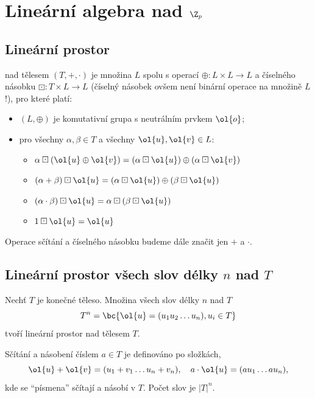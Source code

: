 \section{Lineární algebra nad \texorpdfstring{$\Z_p$}{Zp}}

\subsection{Lineární prostor}
 nad tělesem $(T, +, \cdot)$ je množina $L$ spolu s operací $\oplus : L \times L \rightarrow L$ a číselného násobku $\boxdot : T \times L \rightarrow L$ (číselný násobek ovšem není binární operace na množině $L$!), pro které platí:
\vspace{-1em}
\begin{itemize}
	\item $(L, \oplus)$ je komutativní grupa s neutrálním prvkem $\ol{o}$;
	\item pro všechny $\alpha, \beta \in T$ a všechny $\ol{u}, \ol{v} \in L$:
	\vspace{-0.5em}
	\begin{itemize}[$\cdot$]
		\item $\alpha \boxdot (\ol{u} \oplus \ol{v}) = (\alpha \boxdot \ol{u}) \oplus (\alpha \boxdot \ol{v})$
		\item $(\alpha + \beta) \boxdot \ol{u} = (\alpha \boxdot \ol{u}) \oplus (\beta \boxdot \ol{u})$
		\item $(\alpha \cdot \beta) \boxdot \ol{u} = \alpha \boxdot (\beta \boxdot \ol{u})$
		\item $1\boxdot \ol{u} = \ol{u}$
	\end{itemize}
\end{itemize}
\vspace{-1em}
Operace sčítání a číselného násobku budeme dále značit jen $+$ a $\cdot$.

\subsection{Lineární prostor všech slov délky \texorpdfstring{$n$}{n} nad \texorpdfstring{$T$}{T}}
Nechť $T$ je konečné těleso. Množina všech slov délky $n$ nad $T$
\begin{equation}
	T^n = \bc{\ol{u} = (u_1 u_2 \dots u_n), u_i \in T}
\end{equation}
tvoří lineární prostor nad tělesem $T$.

Sčítání a násobení číslem $a \in T$ je definováno po složkách,
\begin{equation}
	\ol{u} + \ol{v} = (u_1 + v_1 \dots u_n + v_n), \quad a \cdot \ol{u} = (au_1 \dots au_n),
\end{equation}
kde se \enquote{písmena} sčítají a násobí v $T$. Počet slov je $|T|^n$.

